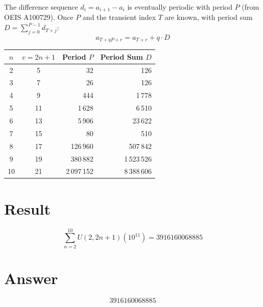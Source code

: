 \documentclass[11pt]{article}
\theoremstyle{definition}
\begin{document}
The difference sequence $d_i = a_{i+1} - a_i$ is eventually periodic with period $P$ (from OEIS A100729). Once $P$ and the transient index $T$ are known, with period sum $D = \sum_{j=0}^{P-1} d_{T+j}$:
\[
a_{T + qP + r} = a_{T+r} + q \cdot D
\]

\begin{center}
\begin{tabular}{|c|c|r|r|}
\hline
$n$ & $v=2n+1$ & Period $P$ & Period Sum $D$ \\
\hline
2 & 5 & 32 & 126 \\
3 & 7 & 26 & 126 \\
4 & 9 & 444 & 1\,778 \\
5 & 11 & 1\,628 & 6\,510 \\
6 & 13 & 5\,906 & 23\,622 \\
7 & 15 & 80 & 510 \\
8 & 17 & 126\,960 & 507\,842 \\
9 & 19 & 380\,882 & 1\,523\,526 \\
10 & 21 & 2\,097\,152 & 8\,388\,606 \\
\hline
\end{tabular}
\end{center}

\section{Result}

\[
\sum_{n=2}^{10} U(2, 2n+1)(10^{11}) = \boxed{3916160068885}
\]

\section{Answer}

\[
\boxed{3916160068885}
\]
\end{document}
